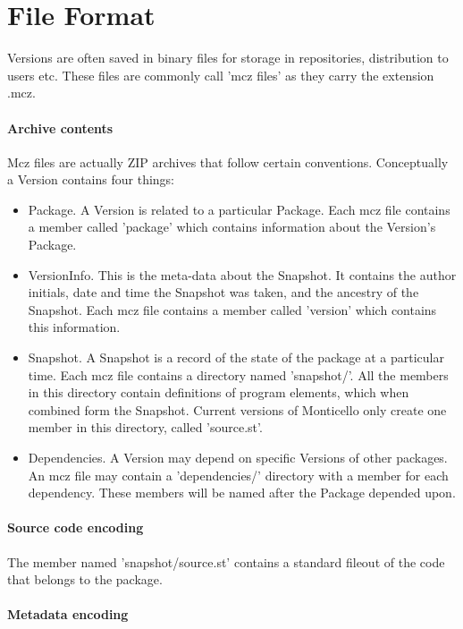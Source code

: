 \documentclass[a4paper,10pt,twoside]{book}
\begin{document}
\section{File Format}

Versions are often saved in binary files for storage in repositories, distribution to users etc. These files are commonly call 'mcz files' as they carry the extension .mcz.

\paragraph{Archive contents}

Mcz files are actually ZIP archives that follow certain conventions. Conceptually a Version contains four things:

\begin{itemize}
\item Package. A Version is related to a particular Package. Each mcz file contains a member called 'package' which contains information about the Version's Package.

\item VersionInfo. This is the meta-data about the Snapshot. It contains the author initials, date and time the Snapshot was taken, and the ancestry of the Snapshot. Each mcz file contains a member called 'version' which contains this information.
\item Snapshot. A Snapshot is a record of the state of the package at a particular time. Each mcz file contains a directory named 'snapshot/'. All the members in this directory contain definitions of program elements, which when combined form the Snapshot. Current versions of Monticello only create one member in this directory, called 'source.st'.
\item Dependencies. A Version may depend on specific Versions of other packages. An mcz file may contain a 'dependencies/' directory with a member for each dependency. These members will be named after the Package depended upon.
\end{itemize}

\paragraph{Source code encoding}

The member named 'snapshot/source.st' contains a standard fileout of the code that belongs to the package.

\paragraph{Metadata encoding}
\end{document}
